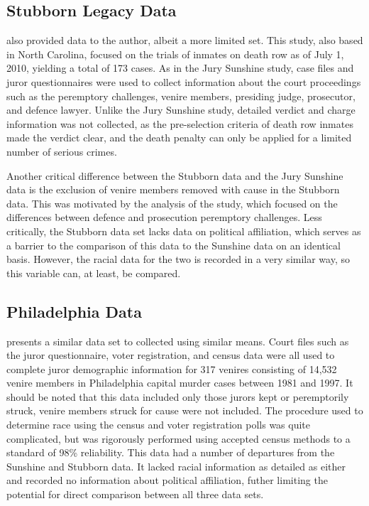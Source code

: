\subsection{Stubborn Legacy Data} \label{sec:norcardata}

\cite{StubbornLegacy} also provided data to the author, albeit a more limited set. This study, also based in North Carolina,
focused on the trials of inmates on death row as of July 1, 2010, yielding a total of 173 cases. As in the Jury Sunshine study, case files and juror questionnaires were used to collect information about the court proceedings such as the peremptory challenges, venire members, presiding judge, prosecutor, and defence lawyer. Unlike the Jury Sunshine study, detailed verdict and charge information was not collected, as the pre-selection criteria of death row inmates made the verdict clear, and the death penalty can only be applied for a limited number of serious crimes.

Another critical difference between the Stubborn data and the Jury Sunshine data is the exclusion of venire members removed with cause in the Stubborn data. This was motivated by the analysis of the study, which focused on the differences between defence and prosecution peremptory challenges. Less critically, the Stubborn data set lacks data on political affiliation, which serves as a barrier to the comparison of this data to the Sunshine data on an identical basis. However, the racial data for the two is recorded in a very similar way, so this variable can, at least, be compared.

\subsection{Philadelphia Data} \label{sec:phillydata}

\cite{PerempChalMurder} presents a similar data set to \cite{StubbornLegacy} collected using similar means. Court files such as
the juror questionnaire, voter registration, and census data were all used to complete juror demographic information for 317
venires consisting of 14,532 venire members in Philadelphia capital murder cases between 1981 and 1997. It should be noted that this data included only those
jurors kept or peremptorily struck, venire members struck for cause were not included. The procedure used to determine
race using the census and voter registration polls was quite complicated, but was rigorously performed using accepted census
methods to a standard of 98\% reliability. This data had a number of departures from the Sunshine and Stubborn data. It lacked racial information as detailed as either and recorded no information about political affiliation, futher limiting the potential for direct comparison between all three data sets.